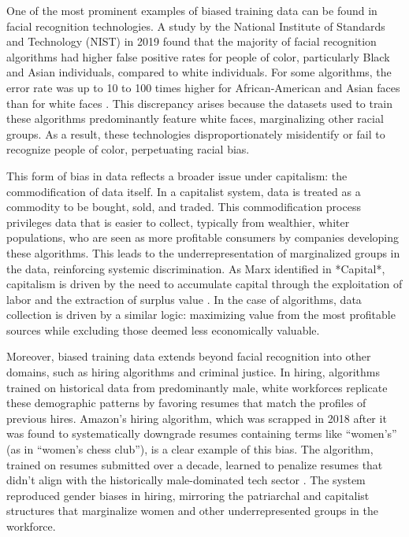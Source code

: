 \begin{refsection}
One of the most prominent examples of biased training data can be found in facial recognition technologies. A study by the National Institute of Standards and Technology (NIST) in 2019 found that the majority of facial recognition algorithms had higher false positive rates for people of color, particularly Black and Asian individuals, compared to white individuals. For some algorithms, the error rate was up to 10 to 100 times higher for African-American and Asian faces than for white faces \cite[pp.~38-40]{grother2019}. This discrepancy arises because the datasets used to train these algorithms predominantly feature white faces, marginalizing other racial groups. As a result, these technologies disproportionately misidentify or fail to recognize people of color, perpetuating racial bias.

This form of bias in data reflects a broader issue under capitalism: the commodification of data itself. In a capitalist system, data is treated as a commodity to be bought, sold, and traded. This commodification process privileges data that is easier to collect, typically from wealthier, whiter populations, who are seen as more profitable consumers by companies developing these algorithms. This leads to the underrepresentation of marginalized groups in the data, reinforcing systemic discrimination. As Marx identified in *Capital*, capitalism is driven by the need to accumulate capital through the exploitation of labor and the extraction of surplus value \cite[pp.~451-452]{marx1867}. In the case of algorithms, data collection is driven by a similar logic: maximizing value from the most profitable sources while excluding those deemed less economically valuable.

Moreover, biased training data extends beyond facial recognition into other domains, such as hiring algorithms and criminal justice. In hiring, algorithms trained on historical data from predominantly male, white workforces replicate these demographic patterns by favoring resumes that match the profiles of previous hires. Amazon's hiring algorithm, which was scrapped in 2018 after it was found to systematically downgrade resumes containing terms like “women’s” (as in “women’s chess club”), is a clear example of this bias. The algorithm, trained on resumes submitted over a decade, learned to penalize resumes that didn’t align with the historically male-dominated tech sector \cite[pp.~67-68]{krivoruchko2021}. The system reproduced gender biases in hiring, mirroring the patriarchal and capitalist structures that marginalize women and other underrepresented groups in the workforce.


\end{refsection}

